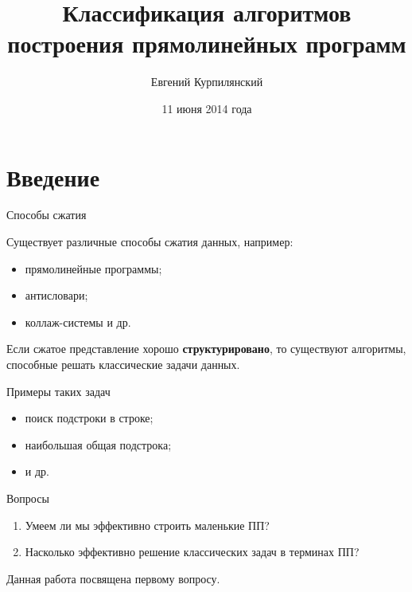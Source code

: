 ﻿\documentclass[10pt,pdf,hyperref={unicode}]{beamer}
\title{Классификация алгоритмов построения прямолинейных программ}
\author{Евгений Курпилянский}
\date{11 июня 2014 года}
\begin{document}
\begin{frame}
\titlepage
\end{frame}

\section{Введение}

\begin{frame}{Способы сжатия}

\begin{block}{}
	Существует различные способы сжатия данных, например:
	\begin{itemize}
		\item прямолинейные программы;
		\item антисловари;
		\item коллаж-системы и др.
	\end{itemize}
\end{block}

\pause

\begin{block}{}
	Если сжатое представление хорошо {\bf структурировано}, то существуют алгоритмы, способные
	решать классические задачи данных.
\end{block}

\pause

\begin{exampleblock}{Примеры таких задач}
	\begin{itemize}
		\item поиск подстроки в строке;
		\item наибольшая общая подстрока;
		\item и др.
	\end{itemize}
\end{exampleblock}

\end{frame}

\begin{frame}

	\begin{block}{Вопросы}
		\begin{enumerate}
			\item Умеем ли мы эффективно строить маленькие ПП?
			\pause
			\item Насколько эффективно решение классических задач в терминах ПП?
		\end{enumerate}
	\end{block}

	\pause

		Данная работа посвящена первому вопросу.
\end{frame}
\end{document}
